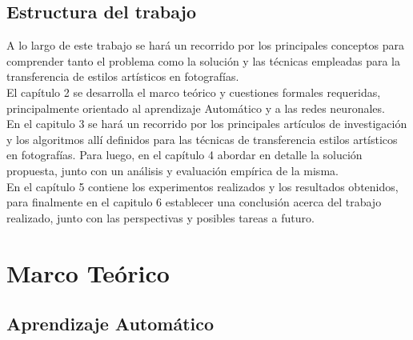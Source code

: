 \documentclass[a4paper,11pt,spanish]{book}
\begin{document}
  \section {Estructura del trabajo}
    A lo largo de este trabajo se hará un recorrido por los principales conceptos para comprender tanto el problema como la solución y las técnicas empleadas para la transferencia
    de estilos artísticos en fotografías.\\
    El capítulo 2 se desarrolla el marco teórico y cuestiones formales requeridas, principalmente orientado al aprendizaje Automático y a las redes neuronales.\\
    En el capitulo 3 se hará un recorrido por los principales artículos de investigación y los algoritmos allí definidos para las técnicas de transferencia estilos artísticos en fotografías.
    Para luego, en el capítulo 4 abordar en detalle la solución propuesta, junto con un análisis y evaluación empírica de la misma.\\
    En el capítulo 5 contiene los experimentos realizados y los resultados obtenidos, para finalmente en el capitulo 6 establecer una conclusión acerca del trabajo realizado,
    junto con las perspectivas y posibles tareas a futuro.

\chapter{Marco Teórico}




  \section{Aprendizaje Automático}
\end{document}
